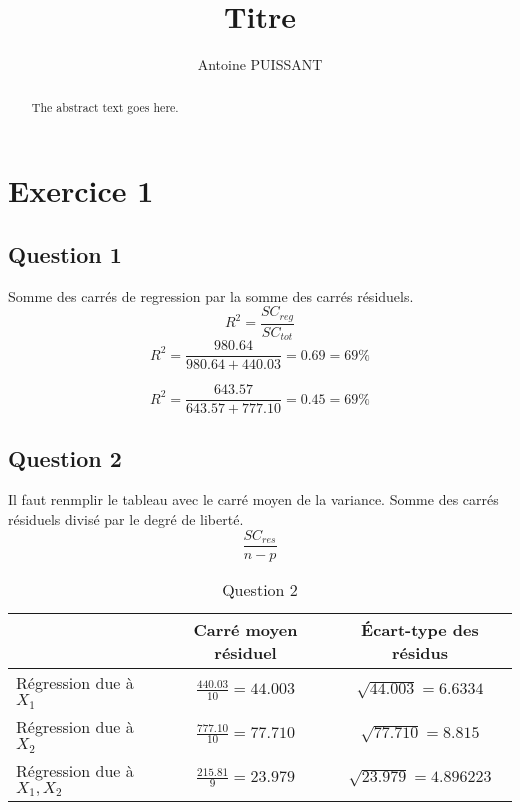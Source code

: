 \documentclass{article}
\begin{document}
\title{Titre}
\author{Antoine PUISSANT}

\maketitle

\begin{abstract}
The abstract text goes here.
\end{abstract}
\newpage
\tableofcontents
\newpage
\section{Exercice 1}
\subsection{Question 1}
Somme des carr\'es de regression par la somme des carr\'es r\'esiduels.\newline
\begin{equation}
  \label{simple_equation}
  R^{2} = \frac{SC_{reg}}{SC_{tot}}
\end{equation}
\begin{equation}
  \label{simple_equation}
  R^{2} = \frac{980.64}{980.64 + 440.03} = 0.69 = 69\%
\end{equation}

\begin{equation}
  \label{simple_equation}
  R^{2} = \frac{643.57}{643.57 + 777.10} = 0.45 = 69\%
\end{equation}

\subsection{Question 2}
Il faut renmplir le tableau avec le carré moyen de la variance.
Somme des carrés résiduels divisé par le degré de liberté.
\begin{equation}
  \label{simple_equation}
  \frac{SC_{res}}{n - p}
\end{equation}
\begin{table}[!ht]
  \centering
  \footnotesize
  \begin{tabular}{lcc}\toprule
    & Carré moyen résiduel & \'Ecart-type des résidus\\\midrule
    Régression due à \(X_{1}\) & \(\frac{440.03}{10} = 44.003\) & \(\sqrt{44.003} = 6.6334\)\\
    Régression due à \(X_{2}\) & \(\frac{777.10}{10} = 77.710\) & \(\sqrt{77.710} = 8.815\)\\
    Régression due à \(X_{1}, X_{2}\) & \(\frac{215.81}{9} = 23.979\) & \(\sqrt{23.979} = 4.896223\)\\\bottomrule
  \end{tabular}
  \caption{Question 2}\label{tab:table}
\end{table}
\end{document}
